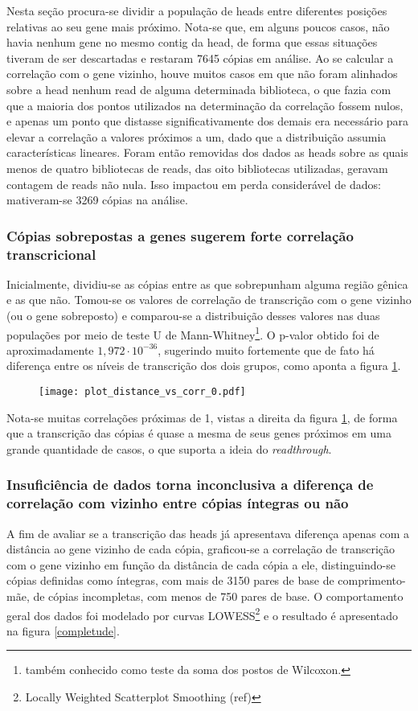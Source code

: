 \documentclass[12pt]{article}
\begin{document}
\begin{multicols}{2}
Nesta seção procura-se dividir a população de heads entre diferentes posições relativas ao seu gene mais próximo. Nota-se que, em alguns poucos casos, não havia nenhum gene no mesmo contig da head, de forma que essas situações tiveram de ser descartadas e restaram 7645 cópias em análise. Ao se calcular a correlação com o gene vizinho, houve muitos casos em que não foram alinhados sobre a head nenhum read de alguma determinada biblioteca, o que fazia com que a maioria dos pontos utilizados na determinação da correlação fossem nulos, e apenas um ponto que distasse significativamente dos demais era necessário para elevar a correlação a valores próximos a um, dado que a distribuição assumia características lineares. Foram então removidas dos dados as heads sobre as quais menos de quatro bibliotecas de reads, das oito bibliotecas utilizadas, geravam contagem de reads não nula. Isso impactou em perda considerável de dados: mativeram-se 3269 cópias na análise.

\subsubsection{Cópias sobrepostas a genes sugerem forte correlação transcricional}
Inicialmente, dividiu-se as cópias entre as que sobrepunham alguma região gênica e as que não. Tomou-se os valores de correlação de transcrição com o gene vizinho (ou o gene sobreposto) e comparou-se a distribuição desses valores nas duas populações por meio de teste U de Mann-Whitney\footnote{também conhecido como teste da soma dos postos de Wilcoxon.}. O p-valor obtido foi de aproximadamente \(1,972 \cdot 10^{-36}\), sugerindo muito fortemente que de fato há diferença entre os níveis de transcrição dos dois grupos, como aponta a figura \ref{histintegridade}.

\begin{figure}[H]
	\centering
	\label{histintegridade}
	\texttt{[image: plot\_distance\_vs\_corr\_0.pdf]}
\end{figure}

Nota-se muitas correlações próximas de 1, vistas a direita da figura \ref{histintegridade}, de forma que a transcrição das cópias é quase a mesma de seus genes próximos em uma grande quantidade de casos, o que suporta a ideia do \textit{readthrough}.

\subsubsection{Insuficiência de dados torna inconclusiva a diferença de correlação com vizinho entre cópias íntegras ou não}
A fim de avaliar se a transcrição das heads já apresentava diferença apenas com a distância ao gene vizinho de cada cópia, graficou-se a correlação de transcrição com o gene vizinho em função da distância de cada cópia a ele, distinguindo-se cópias definidas como íntegras, com mais de 3150 pares de base de comprimento-mãe, de cópias incompletas, com menos de 750 pares de base. O comportamento geral dos dados foi modelado por curvas LOWESS\footnote{Locally Weighted Scatterplot Smoothing (ref)} e o resultado é apresentado na figura \ref{completude}.


\end{multicols}
\end{document}
